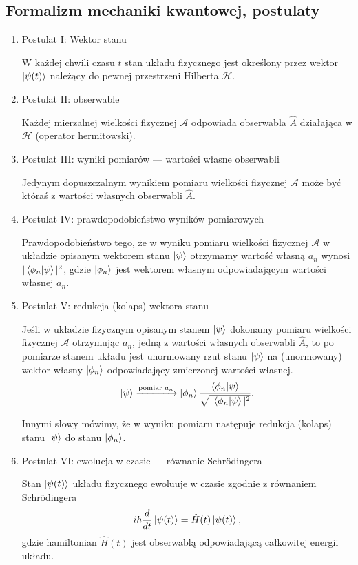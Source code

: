 \subsection{Formalizm mechaniki kwantowej, postulaty}
\begin{enumerate}
	\item Postulat I: Wektor stanu
	
	W każdej chwili czasu $t$ stan układu fizycznego jest określony przez wektor $\ket{\psi(t)}$ należący do pewnej przestrzeni Hilberta $\mathcal{H}$.
	
	\item Postulat II: obserwable
	
	Każdej mierzalnej wielkości fizycznej $\mathcal{A}$ odpowiada obserwabla $\hat{A}$ działająca w $\mathcal{H}$ (operator hermitowski).
	
	\item Postulat III: wyniki pomiarów --- wartości własne obserwabli
	
	Jedynym dopuszczalnym wynikiem pomiaru wielkości fizycznej $\mathcal{A}$ może być któraś z wartości własnych obserwabli $\hat{A}$.
	
	\item Postulat IV: prawdopodobieństwo wyników pomiarowych
	
	Prawdopodobieństwo tego, że w wyniku pomiaru wielkości fizycznej $\mathcal{A}$ w układzie opisanym wektorem stanu $\ket{\psi}$ otrzymamy wartość własną $a_n$ wynosi $|\braket{\phi_n}{\psi}|^2$, gdzie $\ket{\phi_n}$ jest wektorem własnym odpowiadającym wartości własnej $a_n$.
	
	\item Postulat V: redukcja (kolaps) wektora stanu
	
	Jeśli w układzie fizycznym opisanym stanem $\ket{\psi}$ dokonamy pomiaru wielkości fizycznej $\mathcal{A}$ otrzymując $a_n$, jedną z wartości własnych obserwabli $\hat{A}$, to po pomiarze stanem układu jest unormowany rzut stanu $\ket{\psi}$ na (unormowany) wektor własny $\ket{\phi_n}$ odpowiadający zmierzonej wartości własnej.
	\begin{equation*}
		\ket{\psi} \xrightarrow{\text{pomiar } a_n} \ket{\phi_n}\frac{\braket{\phi_n}{\psi}}{\sqrt{|\braket{\phi_n}{\psi}|^2}}.
	\end{equation*}
	
	Innymi słowy mówimy, że w wyniku pomiaru następuje redukcja (kolaps) stanu $\ket{\psi}$ do stanu $\ket{\phi_n}$.
	
	\item Postulat VI: ewolucja w czasie --- równanie Schrödingera
	
	Stan $\ket{\psi(t)}$ układu fizycznego ewoluuje w czasie zgodnie z równaniem Schrödingera
	\begin{equation*}
		i\hbar\frac{d}{dt} \ket{\psi(t)} = \hat{H}(t)\ket{\psi(t)},
	\end{equation*}
	gdzie hamiltonian $\hat{H}(t)$ jest obserwablą odpowiadającą całkowitej energii układu. 
\end{enumerate}

